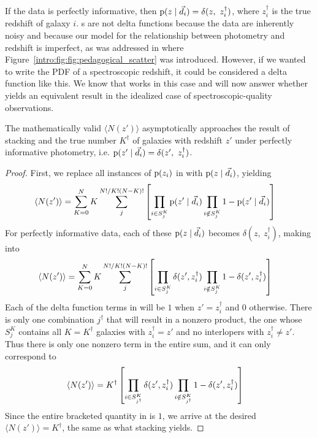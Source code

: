 If the data is perfectly informative, then $\pr{z \gvn \data_{i}} = \delta(z,\ z_{i}^{\dagger})$, where $z_{i}^{\dagger}$ is the true redshift of galaxy $i$.
\Pzpdf s are not delta functions because the data are inherently noisy and because our model for the relationship between photometry and redshift is imperfect, as was addressed in  where Figure~\ref{intro:fig:fig:pedagogical_scatter} was introduced.
However, if we wanted to write the PDF of a spectroscopic redshift, it could be considered a delta function like this.
We know that  works in this case and will now answer whether  yields an equivalent result in the idealized case of spectroscopic-quality observations.

\begin{theorem}
	\label{thm:informative}
	The mathematically valid $\langle N(z') \rangle$ asymptotically approaches the result of stacking and the true number $K^{\dagger}$ of galaxies with redshift $z'$ under perfectly informative photometry, i.e. $\pr{z' \gvn \data_{i}} = \delta(z',\ z^{\dagger}_{i})$.
\end{theorem}
\begin{proof}
	First, we replace all instances of $\mathrm{p}(z_{i})$ in  with $\mathrm{p}(z \mid \vec{d}_{i})$, yielding
	\begin{align}
	\eqlabel{eqn:proofwithdata1}
	\langle N(z') \rangle &= \sum_{K = 0}^{N} K \sum_{j}^{N! / K! (N - K)!} \left[ \prod_{i \in S^{K}_{j}} \pr{z' \gvn \data_{i}} \prod_{i \notin S^{K}_{j}} 1 - \pr{z' \gvn \data_{i}} \right]
	\end{align}
	For perfectly informative data, each of these $\mathrm{p}(z \mid \vec{d}_{i})$ becomes $\delta(z,\ z^{\dagger}_{i})$, making  into
	\begin{align}
	\eqlabel{eqn:proofwithdata2}
	\langle N(z') \rangle &= \sum_{K = 0}^{N} K \sum_{j}^{N! / K! (N - K)!} \left[ \prod_{i \in S^{K}_{j}} \delta(z', z^{\dagger}_{i}) \prod_{i \notin S^{K}_{j}} 1 - \delta(z', z^{\dagger}_{i}) \right]
	\end{align}
	Each of the delta function terms in  will be $1$ when $z' = z^{\dagger}_{i}$ and $0$ otherwise.
	There is only one combination $j^{\dagger}$ that will result in a nonzero product, the one whose $S^{K}_{j}$ contains all $K = K^{\dagger}$ galaxies with $z^{\dagger}_{i} = z'$ and no interlopers with $z^{\dagger}_{i} \neq z'$.
	Thus there is only one nonzero term in the entire sum, and it can only correspond to 
	\begin{align}
	\eqlabel{eqn:proofwithdata3}
	\langle N(z') \rangle &= K^{\dagger} \left[ \prod_{i \in S^{K}_{j^{\dagger}}} \delta(z', z^{\dagger}_{i}) \prod_{i \notin S^{K}_{j^{\dagger}}} 1 - \delta(z', z^{\dagger}_{i}) \right]
	\end{align}
	Since the entire bracketed quantity in  is $1$, we arrive at the desired $\langle N(z') \rangle = K^{\dagger}$, the same as what stacking yields.
\end{proof}

